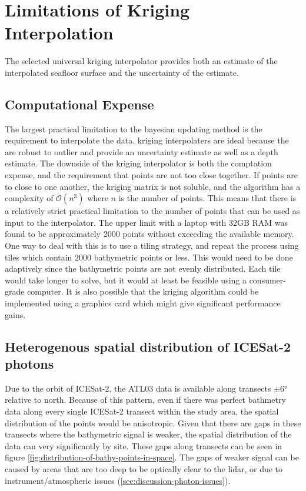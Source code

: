 \section{Limitations of Kriging Interpolation}

The selected universal kriging interpolator provides both an estimate of the interpolated seafloor surface and the uncertainty of the estimate.

\subsection{Computational Expense}

The largest practical limitation to the bayesian updating method is the requirement to interpolate the data. kriging interpolaters are ideal because the are robust to outlier and provide an uncertainty estimate as well as a depth estimate. The downside of the kriging interpolator is both the comptation expense, and the requirement that points are not too close together. If points are to close to one another, the kriging matrix is not soluble, and the algorithm has a complexity of $\mathcal{O}(n^3)$ where $n$ is the number of points. This means that there is a relatively strict practical limitation to the number of points that can be used as input to the interpolator. The upper limit with a laptop with 32GB RAM was found to be approximately 2000 points without exceeding the available memory. One way to deal with this is to use a tiling strategy, and repeat the process using tiles which contain 2000 bathymetric points or less. This would need to be done adaptively since the bathymetric points are not evenly distributed. Each tile would take longer to solve, but it would at least be feasible using a consumer-grade computer. It is also possible that the kriging algorithm could be implemented using a graphics card which might give significant performance gains.

\subsection{Heterogenous spatial distribution of ICESat-2 photons}

Due to the orbit of ICESat-2, the ATL03 data is available along transects $\pm \ang{6}$ relative to north. Because of this pattern, even if there was perfect bathmetry data along every single ICESat-2 transect within the study area, the spatial distribution of the points would be anisotropic. Given that there are gaps in these transects where the bathymetric signal is weaker, the spatial distribution of the data can very significantly by site. These gaps along transects can be seen in figure \ref{fig:distribution-of-bathy-points-in-space}. The gaps of weaker signal can be caused by areas that are too deep to be optically clear to the lidar, or due to instrument/atmospheric issues (\ref{sec:discussion-photon-issues}). 

